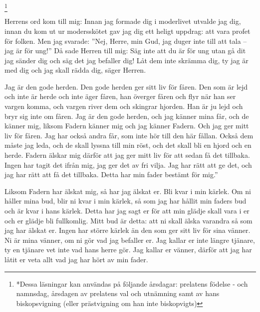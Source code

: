\let\thefootnote\relax\footnote{*Dessa läsningar kan användas på följande årsdagar: prelatens födelse - och namnsdag, årsdagen av prelatens val och utnämning samt av hans biskopsvigning (eller prästvigning om han inte biskopvigts)}

Herrens ord kom till mig:
Innan jag formade dig i moderlivet
utvalde jag dig,
innan du kom ut ur modersskötet
gav jag dig ett heligt uppdrag:
att vara profet för folken.
Men jag svarade: ”Nej, Herre, min Gud, jag duger inte till att tala – jag är för ung!” Då sade Herren till mig:
Säg inte att du är för ung
utan gå dit jag sänder dig
och säg det jag befaller dig!
Låt dem inte skrämma dig,
ty jag är med dig
och jag skall rädda dig,
säger Herren.



Jag är den gode herden. Den gode herden ger sitt liv för fåren.
Den som är lejd och inte är herde och inte äger fåren, han överger fåren och flyr när han ser vargen komma, och vargen river dem och skingrar hjorden.
Han är ju lejd och bryr sig inte om fåren.
Jag är den gode herden, och jag känner mina får, och de känner mig,
liksom Fadern känner mig och jag känner Fadern. Och jag ger mitt liv för fåren.
Jag har också andra får, som inte hör till den här fållan. Också dem måste jag leda, och de skall lyssna till min röst, och det skall bli en hjord och en herde.
Fadern älskar mig därför att jag ger mitt liv för att sedan få det tillbaka.
Ingen har tagit det ifrån mig, jag ger det av fri vilja. Jag har rätt att ge det, och jag har rätt att få det tillbaka. Detta har min fader bestämt för mig.”



Liksom Fadern har älskat mig, så har jag älskat er. Bli kvar i min kärlek.
Om ni håller mina bud, blir ni kvar i min kärlek, så som jag har hållit min faders bud och är kvar i hans kärlek.
Detta har jag sagt er för att min glädje skall vara i er och er glädje bli fullkomlig.
Mitt bud är detta: att ni skall älska varandra så som jag har älskat er.
Ingen har större kärlek än den som ger sitt liv för sina vänner.
Ni är mina vänner, om ni gör vad jag befaller er.
Jag kallar er inte längre tjänare, ty en tjänare vet inte vad hans herre gör. Jag kallar er vänner, därför att jag har låtit er veta allt vad jag har hört av min fader.